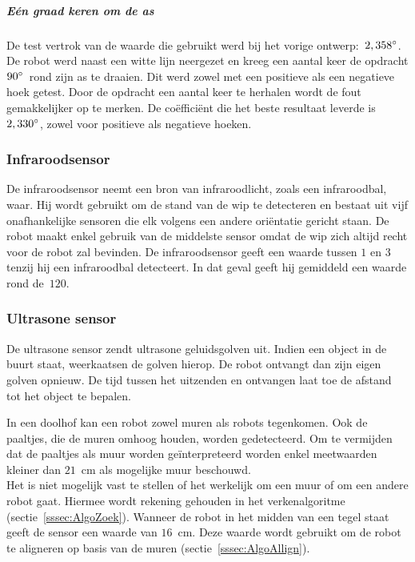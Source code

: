\documentclass[eind]{penoverslag}
\begin{document}

\subparagraph{E\'en graad keren om de as}
De test vertrok van de waarde die gebruikt werd bij het vorige ontwerp:~$2,358\degree$. De robot werd naast een witte lijn neergezet en kreeg een aantal keer de opdracht $90\degree$~rond zijn as te draaien. Dit werd zowel met een positieve als een negatieve hoek getest. Door de opdracht een aantal keer te herhalen wordt de fout gemakkelijker op te merken.
De co\"effici\"ent die het beste resultaat leverde is~$2,330\degree$, zowel voor positieve als negatieve hoeken.



\subsubsection{Infraroodsensor}
De infraroodsensor neemt een bron van infraroodlicht, zoals een infraroodbal, waar. Hij wordt gebruikt om de stand van de wip te detecteren en bestaat uit vijf onafhankelijke sensoren die elk volgens een andere ori\"entatie gericht staan. De robot maakt enkel gebruik van de middelste sensor omdat de wip zich altijd recht voor de robot zal bevinden. De infraroodsensor geeft een waarde tussen $1$ en $3$ tenzij hij een infraroodbal detecteert. In dat geval geeft hij gemiddeld een waarde rond de~$120$.

\subsubsection{Ultrasone sensor}
De ultrasone sensor zendt ultrasone geluidsgolven uit. Indien een object in de buurt staat, weerkaatsen de golven hierop. De robot ontvangt dan zijn eigen golven opnieuw. De tijd tussen het uitzenden en ontvangen laat toe de afstand tot het object te bepalen.

In een doolhof kan een robot zowel muren als robots tegenkomen. Ook de paaltjes, die de muren omhoog houden, worden gedetecteerd. Om te vermijden dat de paaltjes als muur worden ge\"interpreteerd worden enkel meetwaarden kleiner dan $21$~cm als mogelijke muur beschouwd.\\ Het is niet mogelijk vast te stellen of het werkelijk om een muur of om een andere robot gaat. Hiermee wordt rekening gehouden in het verkenalgoritme (sectie~\ref{sssec:AlgoZoek}). Wanneer de robot in het midden van een tegel staat geeft de sensor een waarde van $16$~cm. Deze waarde wordt gebruikt om de robot te aligneren op basis van de muren (sectie~\ref{sssec:AlgoAllign}).
\end{document}
